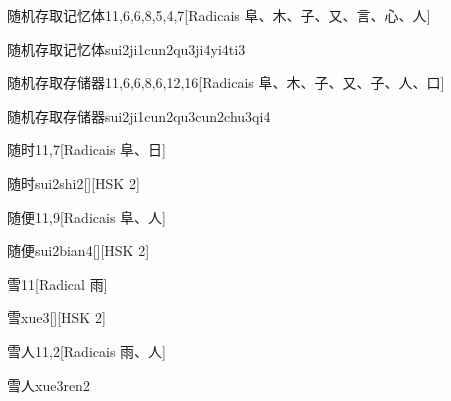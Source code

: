 \begin{entry}{随机存取记忆体}{11,6,6,8,5,4,7}[Radicais ⾩、⽊、⼦、⼜、⾔、⼼、⼈]
  \begin{phonetics}{随机存取记忆体}{sui2ji1cun2qu3ji4yi4ti3}
  \end{phonetics}
\end{entry}

\begin{entry}{随机存取存储器}{11,6,6,8,6,12,16}[Radicais ⾩、⽊、⼦、⼜、⼦、⼈、⼝]
  \begin{phonetics}{随机存取存储器}{sui2ji1cun2qu3cun2chu3qi4}
  \end{phonetics}
\end{entry}

\begin{entry}{随时}{11,7}[Radicais ⾩、⽇]
  \begin{phonetics}{随时}{sui2shi2}[][HSK 2]
  \end{phonetics}
\end{entry}

\begin{entry}{随便}{11,9}[Radicais ⾩、⼈]
  \begin{phonetics}{随便}{sui2bian4}[][HSK 2]
  \end{phonetics}
\end{entry}

\begin{entry}{雪}{11}[Radical ⾬]
  \begin{phonetics}{雪}{xue3}[][HSK 2]
  \end{phonetics}
\end{entry}

\begin{entry}{雪人}{11,2}[Radicais ⾬、⼈]
  \begin{phonetics}{雪人}{xue3ren2}
  \end{phonetics}
\end{entry}

